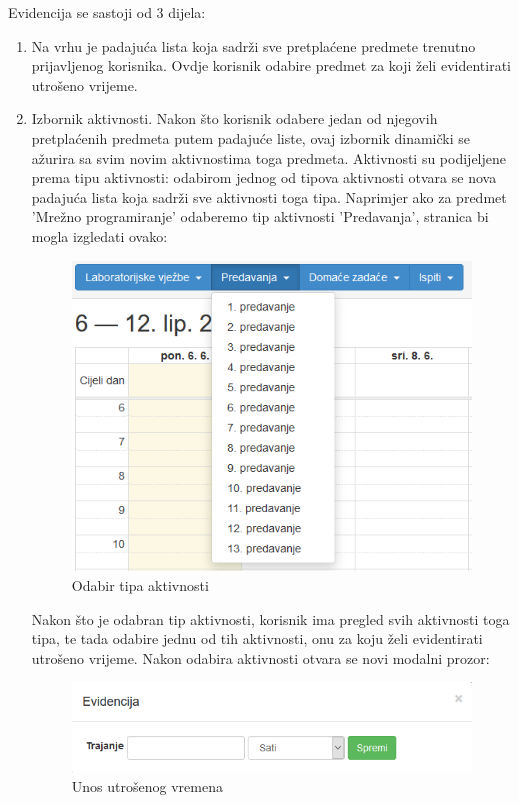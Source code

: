 \documentclass[times, utf8, zavrsni, numeric]{fer}
\begin{document}
Evidencija se sastoji od 3 dijela:

\begin{enumerate}
\item Na vrhu je padajuća lista koja sadrži sve pretplaćene predmete trenutno prijavljenog korisnika. Ovdje korisnik odabire predmet za koji želi evidentirati utrošeno vrijeme.

\item Izbornik aktivnosti. Nakon što korisnik odabere jedan od njegovih pretplaćenih predmeta putem padajuće liste, ovaj izbornik dinamički se ažurira sa svim novim aktivnostima toga predmeta. Aktivnosti su podijeljene prema tipu aktivnosti: odabirom jednog od tipova aktivnosti otvara se nova padajuća lista koja sadrži sve aktivnosti toga tipa. Naprimjer ako za predmet 'Mrežno programiranje' odaberemo tip aktivnosti 'Predavanja', stranica bi mogla izgledati ovako:

\begin{figure}[H]
\centering
\includegraphics[width=\textwidth,height=\textheight,keepaspectratio]{img/selekcija.png}
\caption{Odabir tipa aktivnosti}
\label{fig:selekcija}
\end{figure}

Nakon što je odabran tip aktivnosti, korisnik ima pregled svih aktivnosti toga tipa, te tada odabire jednu od tih aktivnosti, onu za koju želi evidentirati utrošeno vrijeme. Nakon odabira aktivnosti otvara se novi modalni prozor:

\begin{figure}[H]
\centering
\includegraphics[width=\textwidth,height=\textheight,keepaspectratio]{img/modal.png}
\caption{Unos utrošenog vremena}
\label{fig:modal}
\end{figure}


\end{enumerate}
\end{document}
